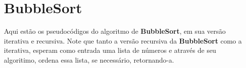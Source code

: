 \section{BubbleSort}
Aqui estão os pseudocódigos do algoritmo de \textbf{BubbleSort}, em sua versão iterativa e recursiva. Note que tanto a versão recursiva da \textbf{BubbleSort} como a iterativa, esperam como entrada uma lista de números e através de seu algoritimo, ordena essa lista, se necessário, retornando-a.  
 
 

 

